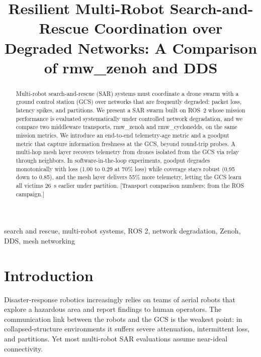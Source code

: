 \documentclass[conference]{IEEEtran}
\title{Resilient Multi-Robot Search-and-Rescue Coordination over
Degraded Networks: A Comparison of rmw\_zenoh and DDS}
\author{\IEEEauthorblockN{Alexandru [Nume]}
\IEEEauthorblockA{Institutul de Mecanica Solidelor (IMSAR)\\
Academia Romana, Bucuresti, Romania}}
\begin{document}
\maketitle

\begin{abstract}
Multi-robot search-and-rescue (SAR) systems must coordinate a drone swarm with
a ground control station (GCS) over networks that are frequently degraded:
packet loss, latency spikes, and partitions. We present a SAR swarm built on
ROS~2 whose mission performance is evaluated systematically under controlled
network degradation, and we compare two middleware transports, rmw\_zenoh and
rmw\_cyclonedds, on the same mission metrics. We introduce an end-to-end
telemetry-age metric and a goodput metric that capture information freshness at
the GCS, beyond round-trip probes. A multi-hop mesh layer recovers telemetry
from drones isolated from the GCS via relay through neighbors. In
software-in-the-loop experiments, goodput degrades monotonically with loss
(1.00 to 0.29 at 70\% loss) while coverage stays robust (0.95 down to 0.85),
and the mesh layer delivers 55\% more telemetry, letting the GCS learn all
victims 26~s earlier under partition. [Transport comparison numbers: from the
ROS campaign.]
\end{abstract}

\begin{IEEEkeywords}
search and rescue, multi-robot systems, ROS 2, network degradation, Zenoh, DDS,
mesh networking
\end{IEEEkeywords}

\section{Introduction}
Disaster-response robotics increasingly relies on teams of aerial robots that
explore a hazardous area and report findings to human operators. The
communication link between the robots and the GCS is the weakest point: in
collapsed-structure environments it suffers severe attenuation, intermittent
loss, and partitions. Yet most multi-robot SAR evaluations assume near-ideal
connectivity.
\end{document}
